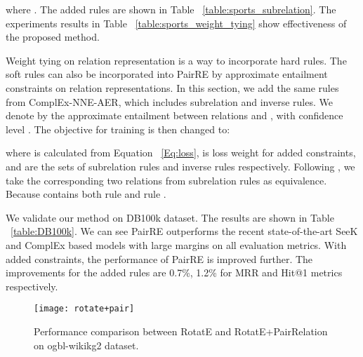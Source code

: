 \documentclass[11pt,a4paper]{article}
\begin{document}
where .
The added rules are shown in Table ~\ref{table:sports_subrelation}.
The experiments results in Table ~\ref{table:sports_weight_tying} show effectiveness of the proposed method.


Weight tying on relation representation is a way to incorporate hard rules.
The soft rules can also be incorporated into PairRE by approximate entailment constraints on relation representations.
In this section, we add the same rules from ComplEx-NNE-AER, which includes subrelation and inverse rules.
We denote by  the approximate entailment between relations  and , with confidence level .
The objective for training is then changed to:

where  is calculated from Equation ~\ref{Eq:loss},  is loss weight for added constraints,  and  are the sets of subrelation rules and inverse rules respectively.
Following \cite{ding2018improving}, we take the corresponding two relations from subrelation rules as equivalence.
Because  contains both rule  and rule .

We validate our method on DB100k dataset. The results are shown in Table ~\ref{table:DB100k}.
We can see PairRE outperforms the recent state-of-the-art SeeK and ComplEx based models with large margins on all evaluation metrics.
With added constraints, the performance of PairRE is improved further.
The improvements for the added rules are 0.7\%, 1.2\% for MRR and Hit@1 metrics respectively.

\begin{figure}[b]
    \centering
    \texttt{[image: rotate+pair]}
\caption{Performance comparison between RotatE and RotatE+PairRelation on ogbl-wikikg2 dataset.}
\label{fig:r}
\end{figure}

\begin{table*}[h]
\begin{center}
\end{center}
\caption{\label{table:FB15k&&wikikg} Experimental results on FB15k and ogbl-wikikg2 by relation category. Results on FB15k are taken from RotatE \cite{sun2019rotate}.
The embedding dimensions for models on ogbl-wikikg2 are same to the experiments in Table \ref{table:ogbl}, which is 100 for real space models and 50 for complex value based models.}
\end{table*}
\end{document}
